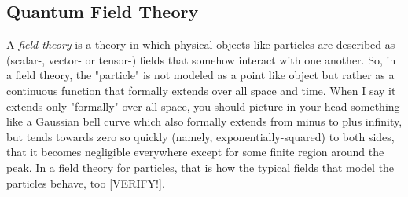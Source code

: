 




% 











\subsection{Quantum Field Theory}

A \emph{field theory} is a theory in which physical objects like particles are described as (scalar-, vector- or tensor-) fields that somehow interact with one another. So, in a field theory, the "particle" is not modeled as a point like object but rather as a continuous function that formally extends over all space and time. When I say it extends only "formally" over all space, you should picture in your head something like a Gaussian bell curve which also formally extends from minus to plus infinity, but tends towards zero so quickly (namely, exponentially-squared) to both sides, that it becomes negligible everywhere except for some finite region around the peak. In a field theory for particles, that is how the typical fields that model the particles behave, too [VERIFY!].

